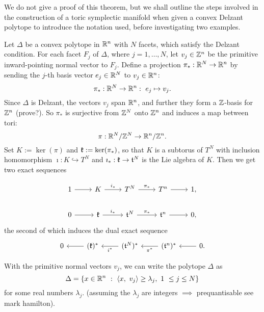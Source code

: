 We do not give a proof of this theorem, but we shall outline the steps involved in the construction of a toric symplectic manifold when given a convex Delzant polytope to introduce the notation used, before investigating two examples.

Let $\Delta$ be a convex polytope in $\mathbb{R}^{n}$ with $N$ facets, which satisfy the Delzant condition. For each facet $F_{j}$ of $\Delta$, where $j = 1, \ldots, N$, let $v_{j} \in \mathbb{Z}^{n}$ be the primitive inward-pointing normal vector to $F_{j}$. Define a projection $\pi_{\ast}: \mathbb{R}^{N} \rightarrow \mathbb{R}^{n}$ by sending the $j$-th basis vector $e_{j} \in \mathbb{R}^{N}$ to $v_{j} \in \mathbb{R}^{n}$:
\begin{equation*}
	\pi_{\ast}: \mathbb{R}^{N} \rightarrow \mathbb{R}^{n}:\ e_{j} \mapsto v_{j}.
\end{equation*}
Since $\Delta$ is Delzant, the vectors $v_{j}$ span $\mathbb{R}^{n}$, and further they form a $\mathbb{Z}$-basis for $\mathbb{Z}^{n}$ (prove?). So $\pi_{\ast}$ is surjective from $\mathbb{Z}^{N}$ onto $\mathbb{Z}^{n}$ and induces a map between tori:
\begin{equation*}
	\pi:\mathbb{R}^{N}/\mathbb{Z}^{N} \rightarrow \mathbb{R}^{n}/\mathbb{Z}^{n}.
\end{equation*}
Set $K:= \ker(\pi)$ and $\mathfrak{k} := \ker(\pi_{\ast})$, so that $K$ is a subtorus of $T^{N}$ with inclusion homomorphism $\imath :K \hookrightarrow T^{N}$ and $\imath_{\ast} : \mathfrak{k} \rightarrow \mathfrak{t}^{N}$ is the Lie algebra of $K$. Then we get two exact sequences

\begin{equation*}
\begin{tikzcd}
1 \arrow{r}
&K \arrow{r}{i_{\ast}}
&T^{N} \arrow{r}{\pi_{\ast}}
&T^{n} \arrow{r}
&1,
\\
0 \arrow{r}
&\mf{k} \arrow{r}{i_{\ast}}
&\mf{t}^{N} \arrow{r}{\pi_{\ast}}
&\mf{t}^{n} \arrow{r}
&0,
\end{tikzcd}
\end{equation*}
the second of which induces the dual exact sequence
\begin{equation*}
\begin{tikzcd}
0
&\arrow{l} (\mf{k})^{\ast}
&\arrow{l}{i^{\ast}} (\mf{t}^{N})^{\ast}
&\arrow{l}{\pi^{\ast}} (\mf{t}^{n})^{\ast}
&\arrow{l} 0.
\end{tikzcd}
\end{equation*}

With the primitive normal vectors $v_{j}$, we can write the polytope $\Delta$ as
\begin{equation*}
	\Delta = \{ x \in \mathbb{R}^{n}\ :\ \langle x,\ v_{j} \rangle \geq \lambda_{j},\ 1\ \leq j \leq N \}
\end{equation*}
for some real numbers $\lambda_{j}$. (assuming the $\lambda_{j}$ are integers $\implies$ prequantisable see mark hamilton).

